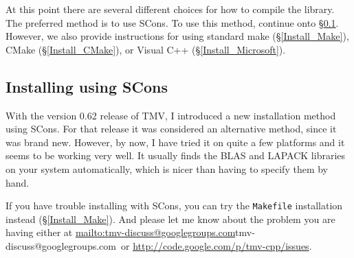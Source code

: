 \documentclass[twoside,letterpaper,11pt]{article}
\makeatletter
\newcommand{\mygroupx}{tmv-discuss@googlegroups.com}
\newcommand{\mygroup}{\url{mailto:\mygroupx}{\mygroupx}}
\newcommand{\myissuesx}{http://code.google.com/p/tmv-cpp/issues}
\newcommand{\myissues}{\url{\myissuesx}}
\makeatother
\begin{document}
At this point there are several different choices for how to compile the library.
The preferred method is to use SCons.  To use this method, continue onto \S\ref{Install_SCons}.
However, we also provide instructions for using standard make (\S\ref{Install_Make}),
CMake (\S\ref{Install_CMake}), or Visual C++ (\S\ref{Install_Microsoft}).



\subsection{Installing using SCons}
\label{Install_SCons}

With the version 0.62 release of TMV, I introduced a new installation method using SCons.  
For that 
release it was considered an alternative method, since it was brand new.  However, by now, I
have tried it on quite a few platforms and it seems to be working very well.  It usually finds
the BLAS and LAPACK libraries on your system automatically, which is nicer than having 
to specify them by hand.

If you have trouble installing with SCons, you can try the 
\texttt{Makefile} installation instead (\S\ref{Install_Make}).  And please let me know about 
the problem you are having either at \mygroup\ or \myissues.
\end{document}
